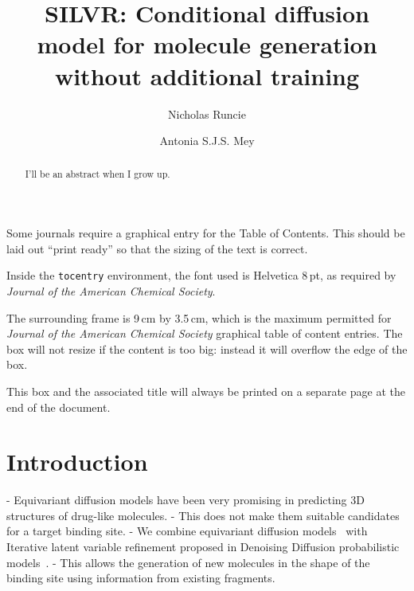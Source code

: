 \documentclass[journal=jacsat,manuscript=article]{achemso}
\author{Nicholas Runcie}
\author{Antonia S.J.S. Mey}
\title[SILVR: Molecular Generation for binding modes]
  {SILVR: Conditional diffusion model for molecule generation without additional training}
\begin{document}
\begin{tocentry}

Some journals require a graphical entry for the Table of Contents.
This should be laid out ``print ready'' so that the sizing of the
text is correct.

Inside the \texttt{tocentry} environment, the font used is Helvetica
8\,pt, as required by \emph{Journal of the American Chemical
Society}.

The surrounding frame is 9\,cm by 3.5\,cm, which is the maximum
permitted for  \emph{Journal of the American Chemical Society}
graphical table of content entries. The box will not resize if the
content is too big: instead it will overflow the edge of the box.

This box and the associated title will always be printed on a
separate page at the end of the document.

\end{tocentry}

\begin{abstract}
I'll be an abstract when I grow up. 
\end{abstract}

\section{Introduction}
- Equivariant diffusion models have been very promising in predicting 3D structures of drug-like molecules. 
- This does not make them suitable candidates for a target binding site. 
- We combine equivariant diffusion models~\cite{huang2022mdm} with Iterative latent variable refinement proposed in Denoising Diffusion probabilistic models~\cite{choi2021ilvr}.
- This allows the generation of new molecules in the shape of the binding site using information from existing fragments.
\end{document}
